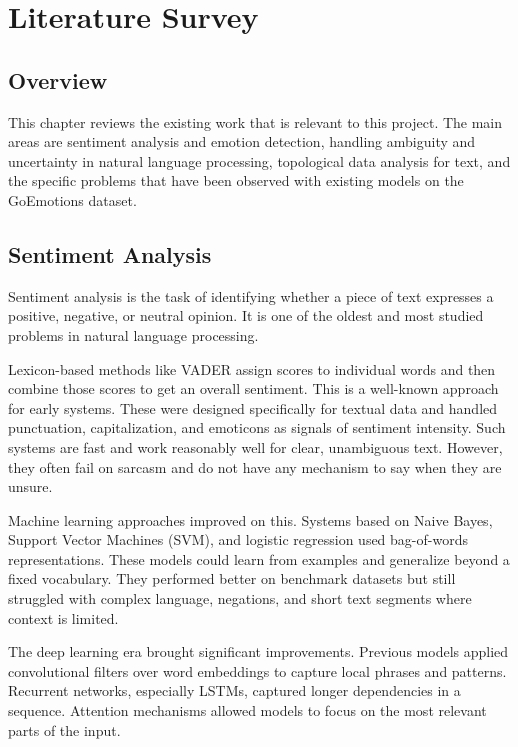 \chapter{Literature Survey}

\section{Overview}

This chapter reviews the existing work that is relevant to this project. The main areas are
sentiment analysis and emotion detection, handling ambiguity and uncertainty in natural language
processing, topological data analysis for text, and the specific problems that have been observed
with existing models on the GoEmotions dataset.

\section{Sentiment Analysis}

Sentiment analysis is the task of identifying whether a piece of text expresses a positive,
negative, or neutral opinion. It is one of the oldest and most studied problems in natural language
processing.

Lexicon-based methods like VADER assign scores to individual words and then combine those scores to get an overall sentiment. This is a well-known approach for early systems. These were designed specifically for textual data and handled punctuation, capitalization, and emoticons as signals of sentiment intensity.
Such systems are fast and work reasonably well for clear, unambiguous text. However, they
often fail on sarcasm and do not have any mechanism to say when they are unsure.

Machine learning approaches improved on this. Systems based on Naive Bayes, Support Vector
Machines (SVM), and logistic regression used bag-of-words representations. These models
could learn from examples and generalize beyond a fixed vocabulary. They performed better on
benchmark datasets but still struggled with complex language, negations, and short text segments where
context is limited.

The deep learning era brought significant improvements. Previous models applied convolutional
filters over word embeddings to capture local phrases and patterns. Recurrent networks,
especially LSTMs, captured longer dependencies in a sequence. Attention mechanisms allowed
models to focus on the most relevant parts of the input.

